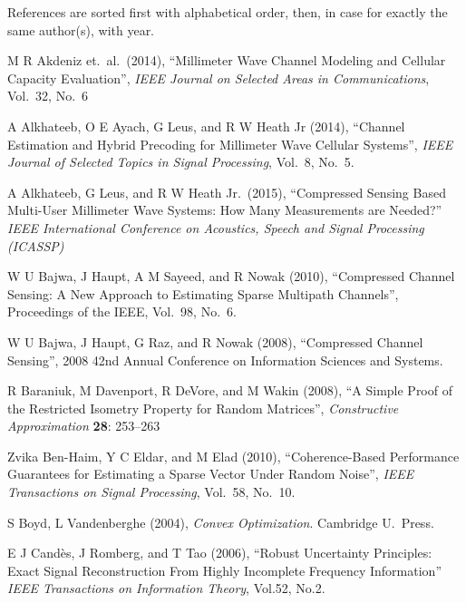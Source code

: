\starttitle [title={References}]

References are sorted first with alphabetical order, then, in case for exactly the same author(s), with year.

\startitemize[n]

\item M R Akdeniz et.\ al.\ (2014), ``Millimeter Wave Channel Modeling and Cellular Capacity Evaluation'', {\it IEEE Journal on Selected Areas in Communications}, Vol.\ 32, No.\ 6

\item A Alkhateeb, O E Ayach, G Leus, and R W Heath Jr (2014), ``Channel Estimation and Hybrid Precoding for Millimeter Wave Cellular Systems'', {\it IEEE Journal of Selected Topics in Signal Processing}, Vol.\ 8, No.\ 5.

\item A Alkhateeb, G Leus, and R W Heath Jr.\ (2015), ``Compressed Sensing Based Multi-User Millimeter Wave Systems: How Many Measurements are Needed?'' {\it IEEE International Conference on Acoustics, Speech and Signal Processing (ICASSP)}

\item W U Bajwa, J Haupt, A M Sayeed, and R Nowak (2010), ``Compressed Channel Sensing: A New Approach to Estimating Sparse Multipath Channels'', Proceedings of the IEEE, Vol.\ 98, No.\ 6.

\item W U Bajwa, J Haupt, G Raz, and R Nowak (2008), ``Compressed Channel Sensing'', 2008 42nd Annual Conference on Information Sciences and Systems.

\item R Baraniuk, M Davenport, R DeVore, and M Wakin (2008), ``A Simple Proof of the Restricted Isometry Property for Random Matrices'', {\it Constructive Approximation} {\bf 28}: 253–263

\item Zvika Ben-Haim, Y C Eldar, and M Elad (2010), ``Coherence-Based Performance Guarantees for Estimating a Sparse Vector Under Random Noise'', {\it IEEE Transactions on Signal Processing}, Vol.\ 58, No.\ 10.

\item S Boyd, L Vandenberghe (2004), {\it Convex Optimization}. Cambridge U.\ Press.

\item E J Cand\`es, J Romberg, and T Tao (2006), ``Robust Uncertainty Principles: Exact Signal Reconstruction From Highly Incomplete Frequency Information'' {\it IEEE Transactions on Information Theory}, Vol.52, No.2.

